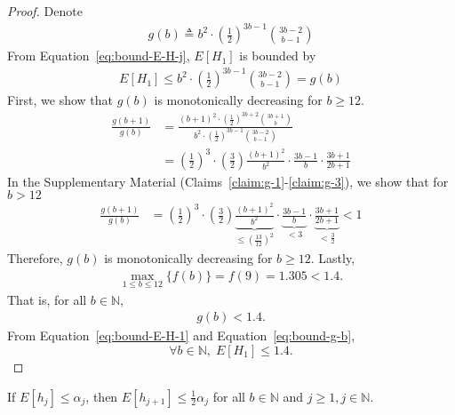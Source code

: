 \begin{proof}
Denote 
\begin{align}
    g(b) \triangleq b^2 \cdot \left(\frac{1}{2}\right)^{3b -1} {{3b-2} \choose b-1}
\end{align}
From Equation~\ref{eq:bound-E-H-j}, $E[H_1]$ is bounded by 
\begin{align}
    E[H_1] \leq b^2 \cdot \left(\frac{1}{2}\right)^{3b -1} {{3b-2} \choose b-1} = g(b)
    \label{eq:bound-E-H-1}
\end{align}
First, we show that $g(b)$ is monotonically decreasing for $b \geq 12$.
\begin{align}
    \frac{g(b+1)}{g(b)} &= \frac{(b+1)^2 \cdot \left(\frac{1}{2}\right)^{3b +2} {{3b+1} \choose b}}{b^2 \cdot \left(\frac{1}{2}\right)^{3b -1} {{3b-2} \choose b-1}} \\
    &= \left(\frac{1}{2}\right)^3 \cdot \left(\frac{3}{2}\right) \frac{(b+1)^2}{b^2} \cdot \frac{3b-1}{b} \cdot \frac{3b+1}{2b+1}
\end{align}
 In the Supplementary Material (Claims~\ref{claim:g-1}-\ref{claim:g-3}), we show that for $b>12$
\begin{align}
     \frac{g(b+1)}{g(b)} &= \left(\frac{1}{2}\right)^3 \cdot \left(\frac{3}{2}\right) \underbrace{\frac{(b+1)^2}{b^2}}_{\leq \left(\frac{13}{12}\right)^2} \cdot \underbrace{\frac{3b-1}{b}}_{<3} \cdot \underbrace{\frac{3b+1}{2b+1}}_{<\frac{3}{2}} < 1
 \end{align}
Therefore, $g(b)$ is monotonically decreasing for $b \geq 12$.
Lastly,
\begin{align}
    \max_{1\leq b \leq 12}\{f(b)\} = f(9)=1.305 < 1.4.
\end{align}
That is, for all $b \in \mathds{N}$,
\begin{align}
    g(b) < 1.4.
    \label{eq:bound-g-b}
\end{align}
From Equation~\ref{eq:bound-E-H-1} and Equation~\ref{eq:bound-g-b},
\[\forall b\in \mathds{N}, \; E[H_{1}] \leq 1.4.\]
\end{proof}
\begin{lemma} \label{lem:holes-Hj}
If $E[h_j] \leq \alpha_{j}$, then $E[h_{j+1}] \leq \frac{1}{2}\alpha_{j}$ for all $b\in \mathds{N}$ and $j\geq1, j\in \mathds{N}$. 
\end{lemma}
